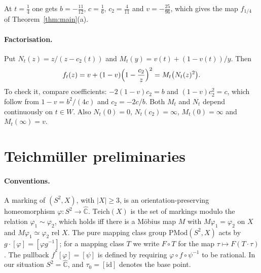 \documentclass[11pt]{article}
\theoremstyle{definition}
\newcommand{\Teich}{\mathrm{Teich}}
\newcommand{\PMod}{\mathrm{PMod}}
\newcommand{\Ch}{\hat{\mathbb C}}
\begin{document}
At $t=\tfrac14$ one gets $b=-\tfrac{11}{12}$, $c=\tfrac16$, $c_2=\tfrac4{11}$ and $v=-\tfrac{25}{96}$, which gives the map $f_{1/4}$ of Theorem~\ref{thm:main}(a).

\paragraph{Factorisation.} Put $N_t(z)=z/(z-c_2(t))$ and $M_t(y)=v(t)+(1-v(t))/y$. Then
\begin{equation}\label{eq:factor}
f_t(z)=v+(1-v)\Bigl(1-\frac{c_2}{z}\Bigr)^2=M_t\bigl(N_t(z)^2\bigr).
\end{equation}
To check it, compare coefficients: $-2(1-v)c_2=b$ and $(1-v)c_2^2=c$, which follow from $1-v=b^2/(4c)$ and $c_2=-2c/b$. Both $M_t$ and $N_t$ depend continuously on $t\in W$. Also $N_t(0)=0$, $N_t(c_2)=\infty$, $M_t(0)=\infty$ and $M_t(\infty)=v$.

\section{Teichm\"uller preliminaries}\label{sec:teich}

\paragraph{Conventions.} A marking of $(S^2,X)$, with $|X|\ge3$, is an orientation-preserving homeomorphism $\varphi\colon S^2\to\Ch$. $\Teich(X)$ is the set of markings modulo the relation $\varphi_1\sim\varphi_2$, which holds iff there is a M\"obius map $M$ with $M\varphi_1=\varphi_2$ on $X$ and $M\varphi_1\simeq\varphi_2$ rel $X$. The pure mapping class group $\PMod(S^2,X)$ acts by $g\cdot[\varphi]=[\varphi g^{-1}]$; for a mapping class $T$ we write $F\circ T$ for the map $\tau\mapsto F(T\cdot\tau)$. The pullback $f^*[\varphi]=[\psi]$ is defined by requiring $\varphi\circ f\circ\psi^{-1}$ to be rational. In our situation $S^2=\Ch$, and $\tau_0=[\mathrm{id}]$ denotes the base point.
\end{document}
